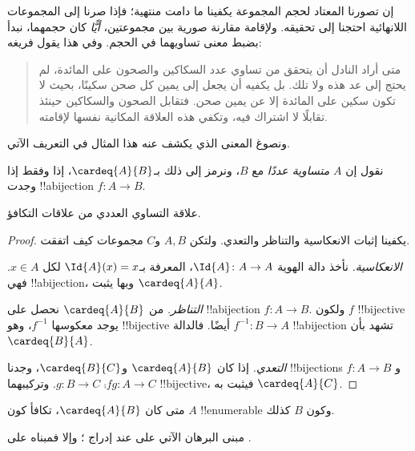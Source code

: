 \documentclass[../../../include/open-logic-section]{subfiles}
\begin{document}


إن تصورنا المعتاد لحجم المجموعة يكفينا ما دامت منتهية؛ فإذا صرنا إلى المجموعات اللانهائية احتجنا إلى تحقيقه. ولإقامة مقارنة صورية بين مجموعتين، \emph{أيًّا} كان حجمهما، نبدأ بضبط معنى تساويهما في الحجم. وفي هذا يقول فريغه:
\begin{quote}
متى أراد النادل أن يتحقق من تساوي عدد السكاكين والصحون على المائدة، لم يحتج إلى عد هذه ولا تلك. بل يكفيه أن يجعل إلى يمين كل صحن سكينًا، بحيث لا تكون سكين على المائدة إلا عن يمين صحن. فتقابل الصحون والسكاكين حينئذ تقابلًا لا اشتراك فيه، وتكفي هذه العلاقة المكانية نفسها لإقامته. \citep[\S70]{Frege1884}
\end{quote}
ونصوغ المعنى الذي يكشف عنه هذا المثال في التعريف الآتي.

\begin{defn}
نقول إن $A$ \emph{متساوية عددًا} مع $B$، ونرمز إلى ذلك بـ$\cardeq{A}{B}$، إذا وفقط إذا وجدت !!a{bijection} $f \colon A \to B$.
\end{defn}

\begin{prop}
علاقة التساوي العددي من علاقات التكافؤ.
\end{prop}

\begin{proof}
يكفينا إثبات الانعكاسية والتناظر والتعدي. ولتكن $A, B$ و$C$ مجموعات كيف اتفقت.

\emph{الانعكاسية.} نأخذ دالة الهوية $\Id{A} \colon A \to A$، المعرفة بـ$\Id{A} (x) = x$ لكل $x \in A$. فهي !!a{bijection}، وبها يثبت $\cardeq{A}{A}$.

\emph{التناظر.} من $\cardeq{A}{B}$ نحصل على !!a{bijection} $f\colon A \to B$. ولكون $f$ !!{bijective} يوجد معكوسها $f^{-1}$، وهو !!{bijective} أيضًا. فالدالة $f^{-1}\colon B \to A$ !!a{bijection} تشهد بأن $\cardeq{B}{A}$.

\emph{التعدي.} إذا كان $\cardeq{A}{B}$ و$\cardeq{B}{C}$، وجدنا !!{bijection}s $f\colon A \to B$ و$g\colon B \to
C$. وتركيبهما $\comp{f}{g}\colon A \to C$ !!{bijective}، فيثبت به $\cardeq{A}{C}$.
\end{proof}

\begin{prop}
متى كان $\cardeq{A}{B}$، تكافأ كون $A$ !!{enumerable} وكون $B$ كذلك.
\end{prop}

\begin{editorial}
مبنى البرهان الآتي على  عند إدراج ؛ وإلا فمبناه على .
\end{editorial}
\end{document}
